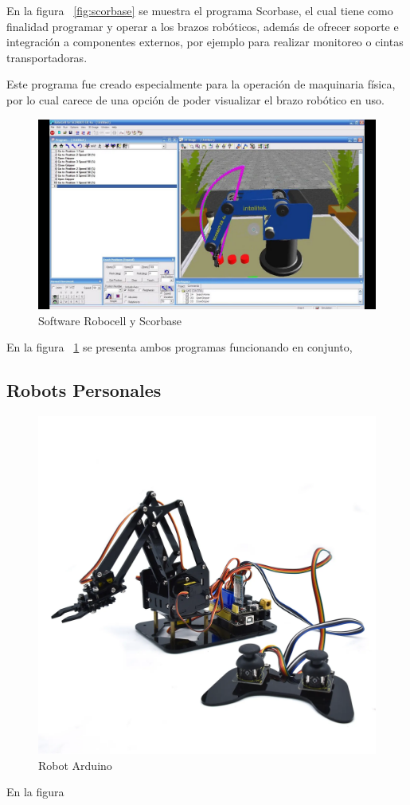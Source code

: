 En la figura ~\ref{fig:scorbase} se muestra el programa Scorbase, el cual tiene como finalidad programar y operar a los brazos robóticos, además de ofrecer soporte e integración a componentes externos, por ejemplo para realizar monitoreo o cintas transportadoras.

Este programa fue creado especialmente para la operación de maquinaria física, por lo cual carece de una opción de poder visualizar el brazo robótico en uso.

\clearpage
\begin{figure}[h]
\centering
\includegraphics[width=13cm]{figures/robocell scorbase.jpg}
\caption{Software Robocell y Scorbase}
\label{fig:robobase}
\end{figure}

En la figura ~\ref{fig:robobase} se presenta ambos programas funcionando en conjunto,

\subsection{Robots Personales}

\begin{figure}[h]
\centering
\includegraphics[width=13cm]{figures/Brazo robotico.png}
\caption{Robot Arduino}
\label{fig:robotarduino}
\end{figure}

En la figura 